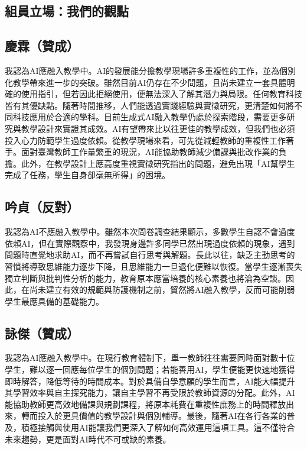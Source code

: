 \subsection{組員立場：我們的觀點}\label{sec:組員立場}

\subsection{慶霖（贊成）}\label{sec:慶霖}

我認為AI應融入教學中。AI的發展能分擔教學現場許多重複性的工作，並為個別化教學帶來進一步的突破。雖然目前AI仍存在不少問題，且尚未建立一套具體明確的使用指引，但若因此拒絕使用，便無法深入了解其潛力與局限。任何教育科技皆有其優缺點。隨著時間推移，人們能透過實踐經驗與實徵研究，更清楚如何將不同科技應用於合適的學科。目前生成式AI融入教學仍處於探索階段，需要更多研究與教學設計來實證其成效。AI有望帶來比以往更佳的教學成效，但我們也必須投入心力防範學生過度依賴。從教學現場來看，可先從減輕教師的重複性工作著手。面對臺灣教師工作量繁重的現況，AI能協助教師減少備課與批改作業的負擔。此外，在教學設計上應高度重視實徵研究指出的問題，避免出現「AI幫學生完成了任務，學生自身卻毫無所得」的困境。

\subsection{吟貞（反對）}\label{sec:吟貞}

我認為AI不應融入教學中。雖然本次問卷調查結果顯示，多數學生自認不會過度依賴AI，但在實際觀察中，我發現身邊許多同學已然出現過度依賴的現象，遇到問題時直覺地求助AI，而不再嘗試自行思考與解題。長此以往，缺乏主動思考的習慣將導致思維能力逐步下降，且思維能力一旦退化便難以恢復。當學生逐漸喪失獨立判斷與批判性分析的能力，教育原本應當培養的核心素養也將淪為空談。因此，在尚未建立有效的規範與防護機制之前，貿然將AI融入教學，反而可能削弱學生最應具備的基礎能力。

\subsection{詠傑（贊成）}\label{sec:詠傑}

我認為AI應融入教學中。在現行教育體制下，單一教師往往需要同時面對數十位學生，難以逐一回應每位學生的個別問題；若能善用AI，學生便能更快速地獲得即時解答，降低等待的時間成本。對於具備自學意願的學生而言，AI能大幅提升其學習效率與自主探究能力，讓自主學習不再受限於教師資源的分配。此外，AI能協助教師更高效地備課與規劃課程，將原本耗費在重複性庶務上的時間釋放出來，轉而投入於更具價值的教學設計與個別輔導。最後，隨著AI在各行各業的普及，積極接觸與使用AI能讓我們更深入了解如何高效運用這項工具。這不僅符合未來趨勢，更是面對AI時代不可或缺的素養。

